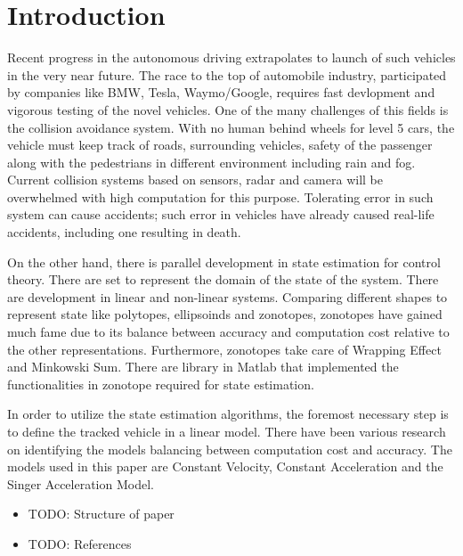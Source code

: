 \chapter{Introduction} \label{ch:intro}
Recent progress in the autonomous driving extrapolates to launch of such vehicles in the very near future. The race to the top of automobile industry, participated by companies like BMW, Tesla, Waymo/Google, requires fast devlopment and vigorous testing of the novel vehicles. One of the many challenges of this fields is the collision avoidance system. With no human behind wheels for level 5 cars, the vehicle must keep track of roads, surrounding vehicles, safety of the passenger along with the pedestrians in different environment including rain and fog. Current collision systems based on sensors, radar and camera will be overwhelmed with high computation for this purpose. Tolerating error in such system can cause accidents; such error in vehicles have already caused real-life accidents, including one resulting in death.


On the other hand, there is parallel development in state estimation for control theory. There are set to represent the domain of the state of the system. There are development in linear and non-linear systems. Comparing different shapes to represent state like polytopes, ellipsoinds and zonotopes, zonotopes have gained much fame due to its balance between accuracy and computation cost relative to the other representations. Furthermore, zonotopes take care of Wrapping Effect and Minkowski Sum. There are library in Matlab that implemented the functionalities in zonotope required for state estimation.

In order to utilize the state estimation algorithms, the foremost necessary step is to define the tracked vehicle in a linear model. There have been various research on identifying the models balancing between computation cost and accuracy. The models used in this paper are Constant Velocity, Constant Acceleration and the Singer Acceleration Model.

\begin{itemize}

\item TODO: Structure of paper
\item TODO: References 
\end{itemize}




